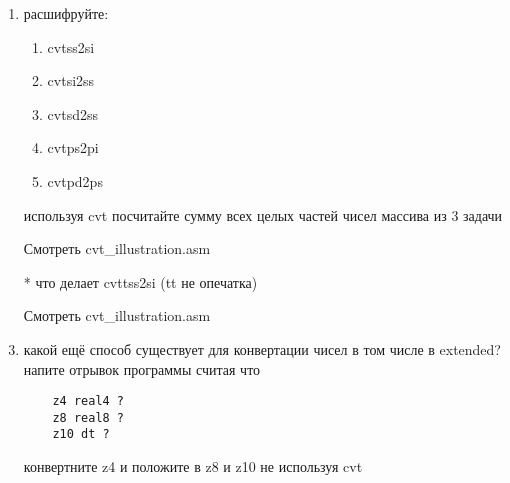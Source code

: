 \documentclass[a4paper,10pt]{article}
\begin{document}
\begin{enumerate}
    \item расшифруйте:
    \begin{enumerate}
        \item cvtss2si 
        \item cvtsi2ss
        \item cvtsd2ss
        \item cvtps2pi
        \item cvtpd2ps 
    \end{enumerate}
    используя cvt посчитайте сумму всех целых частей чисел массива из 3 задачи\par
    Смотреть cvt\_illustration.asm
    \item[*] что делает cvttss2si (tt не опечатка)\par
    Смотреть cvt\_illustration.asm
    \item  какой ещё способ существует для конвертации чисел в том числе в extended? \\
    напите отрывок программы считая что \\
\begin{verbatim}
    z4 real4 ?
    z8 real8 ?
    z10 dt ?
\end{verbatim}
    конвертните z4 и положите в z8 и z10 не используя cvt
\end{enumerate}
\end{document}
